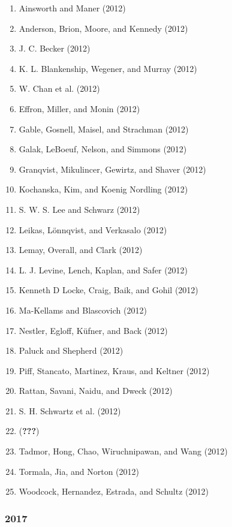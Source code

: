 \documentclass[english,man]{apa6}
\providecommand{\tightlist}{%
  \setlength{\itemsep}{0pt}\setlength{\parskip}{0pt}}
\theoremstyle{definition}
\theoremstyle{definition}
\theoremstyle{definition}
\theoremstyle{remark}
\begin{document}
\begin{enumerate}
\def\labelenumi{\arabic{enumi})}
\tightlist
\item
  Ainsworth and Maner (2012)
\item
  Anderson, Brion, Moore, and Kennedy (2012)
\item
  J. C. Becker (2012)
\item
  K. L. Blankenship, Wegener, and Murray (2012)
\item
  W. Chan et al. (2012)
\item
  Effron, Miller, and Monin (2012)
\item
  Gable, Gosnell, Maisel, and Strachman (2012)
\item
  Galak, LeBoeuf, Nelson, and Simmons (2012)
\item
  Granqvist, Mikulincer, Gewirtz, and Shaver (2012)
\item
  Kochanska, Kim, and Koenig Nordling (2012)
\item
  S. W. S. Lee and Schwarz (2012)
\item
  Leikas, Lönnqvist, and Verkasalo (2012)
\item
  Lemay, Overall, and Clark (2012)
\item
  L. J. Levine, Lench, Kaplan, and Safer (2012)
\item
  Kenneth D Locke, Craig, Baik, and Gohil (2012)
\item
  Ma-Kellams and Blascovich (2012)
\item
  Nestler, Egloff, Küfner, and Back (2012)
\item
  Paluck and Shepherd (2012)
\item
  Piff, Stancato, Martinez, Kraus, and Keltner (2012)
\item
  Rattan, Savani, Naidu, and Dweck (2012)
\item
  S. H. Schwartz et al. (2012)
\item
  ({\textbf{???}})
\item
  Tadmor, Hong, Chao, Wiruchnipawan, and Wang (2012)
\item
  Tormala, Jia, and Norton (2012)
\item
  Woodcock, Hernandez, Estrada, and Schultz (2012)
\end{enumerate}

\subsubsection{2017}\label{section-49}
\end{document}
